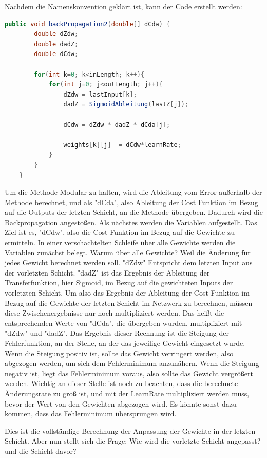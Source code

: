 \documentclass[12pt]{article}
\begin{document}
Nachdem die Namenskonvention geklärt ist, kann der Code erstellt werden:

\begin{lstlisting}[language=Java] 
    public void backPropagation2(double[] dCda) {
        double dZdw;
        double dadZ;
        double dCdw;

        for(int k=0; k<inLength; k++){
            for(int j=0; j<outLength; j++){
                dZdw = lastInput[k];
                dadZ = SigmoidAbleitung(lastZ[j]);

                dCdw = dZdw * dadZ * dCda[j];

                weights[k][j] -= dCdw*learnRate;
            }
        }
    }
\end{lstlisting} 

Um die Methode Modular zu halten, wird die Ableitung vom Error außerhalb der Methode berechnet, und als "dCda", also Ableitung der Cost Funktion im Bezug auf die Outputs der letzten Schicht, an die Methode übergeben. Dadurch wird die Backpropagation angestoßen. Als nächstes werden die Variablen aufgestellt. Das Ziel ist es, "dCdw", also die Cost Funktion im Bezug auf die Gewichte zu ermitteln. 
In einer verschachtelten Schleife über alle Gewichte werden die Variablen zunächst belegt.
Warum über alle Gewichte? Weil die Änderung für jedes Gewicht berechnet werden soll. 
"dZdw" Entspricht dem letzten Input aus der vorletzten Schicht. "dadZ" ist das Ergebnis der Ableitung der Transferfunktion, hier Sigmoid, im Bezug auf die gewichteten Inputs der vorletzten Schicht.
Um also das Ergebnis der Ableitung der Cost Funktion im Bezug auf die Gewichte der letzten Schicht im Netzwerk zu berechnen, müssen diese Zwischenergebnisse nur noch multipliziert werden. Das heißt die entsprechenden Werte von "dCda", die übergeben wurden, multipliziert mit "dZdw" und "dadZ".
Das Ergebnis dieser Rechnung ist die Steigung der Fehlerfunktion, an der Stelle, an der das jeweilige Gewicht eingesetzt wurde. Wenn die Steigung positiv ist, sollte das Gewicht verringert werden, also abgezogen werden, um sich dem Fehlerminimum anzunähern.
Wenn die Steigung negativ ist, liegt das Fehlerminimum voraus, also sollte das Gewicht vergrößert werden.
Wichtig an dieser Stelle ist noch zu beachten, dass die berechnete Änderungsrate zu groß ist, und mit der LearnRate multipliziert werden muss, bevor der Wert von den Gewichten abgezogen wird. Es könnte sonst dazu kommen, dass das Fehlerminimum übersprungen wird.

Dies ist die vollständige Berechnung der Anpassung der Gewichte in der letzten Schicht. Aber nun stellt sich die Frage: Wie wird die vorletzte Schicht angepasst? und die Schicht davor?
\end{document}

